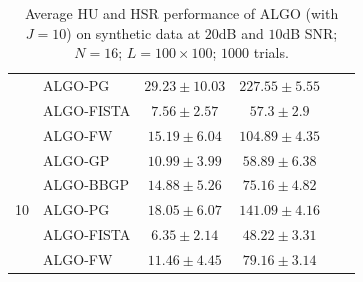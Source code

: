 \begin{table}[h]
\begin{adjustbox}{max width=\textwidth}
\begin{tabular}{|c|l|c|c|c|c|}
                    & ALGO-PG                    & $29.23    \pm 10.03$  & $227.55   \pm 5.55$ \tabularnewline
                    & ALGO-FISTA                 & $7.56     \pm 2.57$   & $57.3     \pm 2.9$  \tabularnewline
                    & ALGO-FW                    & $15.19    \pm 6.04$   & $104.89   \pm 4.35$ \tabularnewline \cline{1-4}
\multirow{5}{*}{10} & ALGO-GP                    & $10.99    \pm 3.99$   & $58.89    \pm 6.38$ \tabularnewline
                    & ALGO-BBGP                  & $14.88    \pm 5.26$   & $75.16    \pm 4.82$ \tabularnewline
                    & ALGO-PG                    & $18.05    \pm 6.07$   & $141.09   \pm 4.16$ \tabularnewline
                    & ALGO-FISTA                 & $6.35     \pm 2.14$   & $48.22    \pm 3.31$ \tabularnewline
                    & ALGO-FW                    & $11.46    \pm 4.45$   & $79.16    \pm 3.14$ \tabularnewline \cline{1-4}
\end{tabular}
\end{adjustbox}
\caption{Average HU and HSR performance of ALGO (with $J=10$) on synthetic
         data at $20$dB and $10$dB SNR; $N = 16$; $L = 100 \times 100$; $1000$
         trials.}
\label{table:results_full_MO16_SNR2010dB_J10}
\end{table}

\newpage

